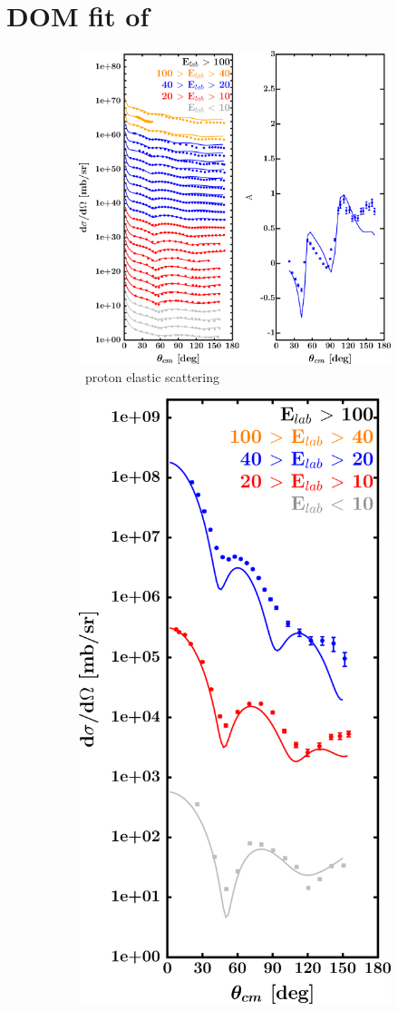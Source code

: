 \newpage
\section{DOM fit of \oEight}
\label{o18DOMOutput}
\begin{figure}[hbtp]
    \captionsetup[subfigure]{labelformat=empty}
    \centering
    \begin{subfigure}[c]{0.39\textheight}
        \centering
        \includegraphics[width=\linewidth]{figures/o18_protonElastic.png}
        \caption{\oEight\ proton elastic scattering}
        \label{DOMFitData_o18_proton_elastic}
    \end{subfigure}\hspace{6pt}
    \begin{subfigure}[c]{0.39\textheight}
        \centering
        \includegraphics[width=0.52\linewidth]{figures/o18_neutronElastic.png}

\end{subfigure}
\end{figure}
